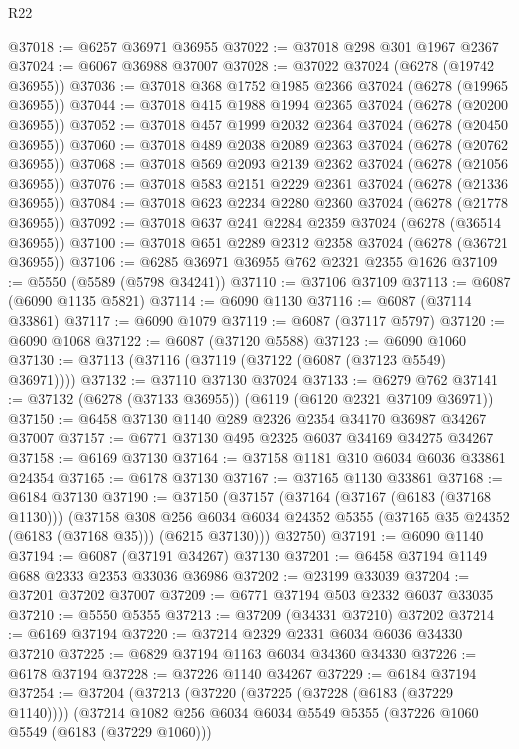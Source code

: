 \begin{lexlean}{R22}
\begin{coremodule}
@37018 := @6257 @36971 @36955
@37022 := @37018 @298 @301 @1967 @2367
@37024 := @6067 @36988 @37007
@37028 := @37022 @37024 (@6278 (@19742 @36955))
@37036 := @37018 @368 @1752 @1985 @2366 @37024 (@6278 (@19965 @36955))
@37044 := @37018 @415 @1988 @1994 @2365 @37024 (@6278 (@20200 @36955))
@37052 := @37018 @457 @1999 @2032 @2364 @37024 (@6278 (@20450 @36955))
@37060 := @37018 @489 @2038 @2089 @2363 @37024 (@6278 (@20762 @36955))
@37068 := @37018 @569 @2093 @2139 @2362 @37024 (@6278 (@21056 @36955))
@37076 := @37018 @583 @2151 @2229 @2361 @37024 (@6278 (@21336 @36955))
@37084 := @37018 @623 @2234 @2280 @2360 @37024 (@6278 (@21778 @36955))
@37092 := @37018 @637 @241 @2284 @2359 @37024 (@6278 (@36514 @36955))
@37100 := @37018 @651 @2289 @2312 @2358 @37024 (@6278 (@36721 @36955))
@37106 := @6285 @36971 @36955 @762 @2321 @2355 @1626
@37109 := @5550 (@5589 (@5798 @34241))
@37110 := @37106 @37109
@37113 := @6087 (@6090 @1135 @5821)
@37114 := @6090 @1130
@37116 := @6087 (@37114 @33861)
@37117 := @6090 @1079
@37119 := @6087 (@37117 @5797)
@37120 := @6090 @1068
@37122 := @6087 (@37120 @5588)
@37123 := @6090 @1060
@37130 := @37113 (@37116 (@37119 (@37122 (@6087 (@37123 @5549) @36971))))
@37132 := @37110 @37130 @37024
@37133 := @6279 @762
@37141 := @37132 (@6278 (@37133 @36955)) (@6119 (@6120 @2321 @37109 @36971))
@37150 := @6458 @37130 @1140 @289 @2326 @2354 @34170 @36987 @34267 @37007
@37157 := @6771 @37130 @495 @2325 @6037 @34169 @34275 @34267
@37158 := @6169 @37130
@37164 := @37158 @1181 @310 @6034 @6036 @33861 @24354
@37165 := @6178 @37130
@37167 := @37165 @1130 @33861
@37168 := @6184 @37130
@37190 := @37150
    (@37157
      (@37164
        (@37167 (@6183 (@37168 @1130)))
        (@37158
          @308
          @256
          @6034
          @6034
          @24352
          @5355
          (@37165 @35 @24352 (@6183 (@37168 @35)))
          (@6215 @37130)))
      @32750)
@37191 := @6090 @1140
@37194 := @6087 (@37191 @34267) @37130
@37201 := @6458 @37194 @1149 @688 @2333 @2353 @33036 @36986
@37202 := @23199 @33039
@37204 := @37201 @37202 @37007
@37209 := @6771 @37194 @503 @2332 @6037 @33035
@37210 := @5550 @5355
@37213 := @37209 (@34331 @37210) @37202
@37214 := @6169 @37194
@37220 := @37214 @2329 @2331 @6034 @6036 @34330 @37210
@37225 := @6829 @37194 @1163 @6034 @34360 @34330
@37226 := @6178 @37194
@37228 := @37226 @1140 @34267
@37229 := @6184 @37194
@37254 := @37204
    (@37213
      (@37220
        (@37225 (@37228 (@6183 (@37229 @1140))))
        (@37214
          @1082
          @256
          @6034
          @6034
          @5549
          @5355
          (@37226 @1060 @5549 (@6183 (@37229 @1060)))

\end{coremodule}
\end{lexlean}
